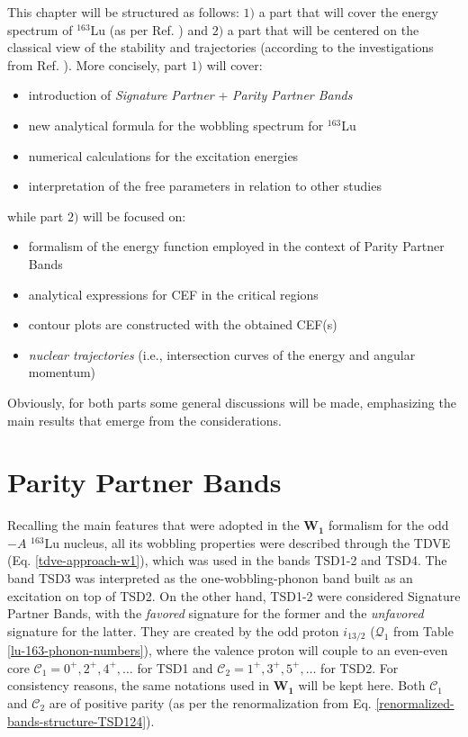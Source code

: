This chapter will be structured as follows: $1)$ a part that will cover the energy spectrum of $^{163}$Lu (as per Ref. \cite{poenaru2021extensive1}) and $2)$ a part that will be centered on the classical view of the stability and trajectories (according to the investigations from Ref. \cite{poenaru2021extensive2}). More concisely, part $1)$ will cover:
\begin{itemize}
    \item introduction of \emph{Signature Partner} + \emph{Parity Partner Bands}
    \item new analytical formula for the wobbling spectrum for $^{163}$Lu
    \item numerical calculations for the excitation energies
    \item interpretation of the free parameters in relation to other studies
\end{itemize}
while part $2)$ will be focused on:
\begin{itemize}
    \item formalism of the energy function employed in the context of Parity Partner Bands
    \item analytical expressions for CEF in the critical regions
    \item contour plots are constructed with the obtained CEF(s)
    \item \emph{nuclear trajectories} (i.e., intersection curves of the energy and angular momentum) 
\end{itemize}

Obviously, for both parts some general discussions will be made, emphasizing the main results that emerge from the considerations.

\section{Parity Partner Bands}
\label{parity-partners-renormalizaion}

Recalling the main features that were adopted in the $\mathbf{W_1}$ formalism for the odd$-A$ $^{163}$Lu nucleus, all its wobbling properties were described through the TDVE (Eq. \ref{tdve-approach-w1}), which was used in the bands TSD1-2 and TSD4. The band TSD3 was interpreted as the one-wobbling-phonon band built as an excitation on top of TSD2. On the other hand, TSD1-2 were considered Signature Partner Bands, with the \emph{favored} signature for the former and the \emph{unfavored} signature for the latter. They are created by the odd proton $i_{13/2}$ ($\mathcal{Q}_1$ from Table \ref{lu-163-phonon-numbers}), where the valence proton will couple to an even-even core $\mathscr{C}_1=0^+,2^+,4^+,\dots$ for TSD1 and $\mathscr{C}_2=1^+,3^+,5^+,\dots$ for TSD2. For consistency reasons, the same notations used in $\mathbf{W_1}$ will be kept here. Both $\mathscr{C}_1$ and $\mathscr{C}_2$ are of positive parity (as per the renormalization from Eq. \ref{renormalized-bands-structure-TSD124}).

